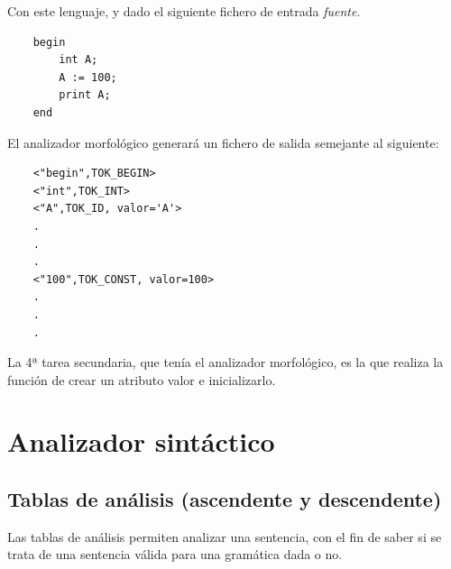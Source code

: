 \documentclass{apuntes}
\begin{document}
Con este lenguaje, y dado el siguiente fichero de entrada  \textit{fuente}.

\begin{verbatim}
    begin
        int A;
        A := 100;
        print A;
    end
\end{verbatim}

El analizador morfológico generará un fichero de salida semejante al siguiente:

\begin{verbatim}
    <"begin",TOK_BEGIN>
    <"int",TOK_INT>
    <"A",TOK_ID, valor='A'>
    .
    .
    .
    <"100",TOK_CONST, valor=100>
    .
    .
    .
\end{verbatim}

La 4ª tarea secundaria, que tenía el analizador morfológico, es la que realiza la función de crear un atributo valor e inicializarlo.

\chapter{Analizador sintáctico}

\section{Tablas de análisis (ascendente y descendente)}
Las tablas de análisis permiten analizar una sentencia, con el fin de saber si se trata de una sentencia válida para una gramática dada o no.
\end{document}
